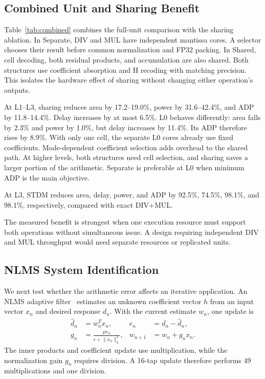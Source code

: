 \documentclass[conference]{IEEEtran}
\begin{document}
\subsection{Combined Unit and Sharing Benefit}
Table~\ref{tab:combined} combines the full-unit comparison with the sharing
ablation. In Separate, DIV and MUL have independent mantissa cores.
A selector chooses their result before common normalization and FP32 packing.
In Shared, cell decoding, both residual products, and accumulation are also
shared. Both structures use coefficient absorption and H recoding with
matching precision. This isolates the hardware effect of sharing without
changing either operation's outputs.

At L1--L3, sharing reduces area by 17.2--19.0\%, power by 31.6--42.4\%,
and ADP by 11.8--14.4\%. Delay increases by at most 6.5\%.
L0 behaves differently: area falls by 2.3\% and power by 1.0\%, but delay
increases by 11.4\%. Its ADP therefore rises by 8.9\%.
With only one cell, the separate L0 cores already use fixed coefficients.
Mode-dependent coefficient selection adds overhead to the shared path.
At higher levels, both structures need cell selection, and sharing saves a
larger portion of the arithmetic. Separate is preferable at L0 when minimum
ADP is the main objective.

At L3, STDM reduces area, delay, power, and ADP by 92.5\%, 74.5\%,
98.1\%, and 98.1\%, respectively, compared with exact DIV+MUL.

The measured benefit is strongest when one execution resource must support
both operations without simultaneous issue. A design requiring independent
DIV and MUL throughput would need separate resources or replicated units.

\subsection{NLMS System Identification}
We next test whether the arithmetic error affects an iterative application.
An NLMS adaptive filter~\cite{yao2024nlms} estimates an unknown coefficient vector
$h$ from an input vector $x_n$ and desired response $d_n$.
With the current estimate $w_n$, one update is
\begin{align}
\widehat d_n &= w_n^{T}x_n,
& e_n &= d_n-\widehat d_n, \nonumber\\
g_n &= \frac{\mu e_n}{\epsilon+\lVert x_n\rVert_2^2},
& w_{n+1} &= w_n+g_nx_n .
\label{eq:nlms}
\end{align}
The inner products and coefficient update use multiplication, while the
normalization gain $g_n$ requires division. A 16-tap update therefore performs
49 multiplications and one division.
\end{document}
